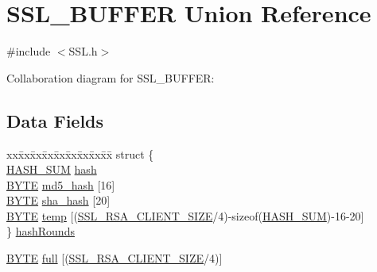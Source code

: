 \hypertarget{union_s_s_l___b_u_f_f_e_r}{}\section{S\+S\+L\+\_\+\+B\+U\+F\+F\+E\+R Union Reference}
\label{union_s_s_l___b_u_f_f_e_r}


{\ttfamily \#include $<$S\+S\+L.\+h$>$}



Collaboration diagram for S\+S\+L\+\_\+\+B\+U\+F\+F\+E\+R\+:
\subsection*{Data Fields}
\begin{DoxyCompactItemize}
\item 
\begin{tabbing}
xx\=xx\=xx\=xx\=xx\=xx\=xx\=xx\=xx\=\kill
struct \{\\
\>\hyperlink{struct_h_a_s_h___s_u_m}{HASH\_SUM} \hyperlink{union_s_s_l___b_u_f_f_e_r_a731167501e52d6b72fc839512360317c}{hash}\\
\>\hyperlink{_generic_type_defs_8h_a4ae1dab0fb4b072a66584546209e7d58}{BYTE} \hyperlink{union_s_s_l___b_u_f_f_e_r_a4d816c823a2beb8993b3ef56766bacce}{md5\_hash} \mbox{[}16\mbox{]}\\
\>\hyperlink{_generic_type_defs_8h_a4ae1dab0fb4b072a66584546209e7d58}{BYTE} \hyperlink{union_s_s_l___b_u_f_f_e_r_a5d335aa13662b316b20dbc8b6f34b12b}{sha\_hash} \mbox{[}20\mbox{]}\\
\>\hyperlink{_generic_type_defs_8h_a4ae1dab0fb4b072a66584546209e7d58}{BYTE} \hyperlink{union_s_s_l___b_u_f_f_e_r_a7b17c7a8a20473315a63c02148759677}{temp} \mbox{[}(\hyperlink{_s_s_l_client_size_8h_a1a30802efbae822f43c0fa208ceea87c}{SSL\_RSA\_CLIENT\_SIZE}/4)-\/sizeof(\hyperlink{struct_h_a_s_h___s_u_m}{HASH\_SUM})-\/16-\/20\mbox{]}\\
\} \hyperlink{union_s_s_l___b_u_f_f_e_r_aefa66f9631daa4521f6a777625f23f5f}{hashRounds}\\

\end{tabbing}\item 
\hyperlink{_generic_type_defs_8h_a4ae1dab0fb4b072a66584546209e7d58}{B\+Y\+T\+E} \hyperlink{union_s_s_l___b_u_f_f_e_r_a4c25cd300ec889961a45436274fc1093}{full} \mbox{[}(\hyperlink{_s_s_l_client_size_8h_a1a30802efbae822f43c0fa208ceea87c}{S\+S\+L\+\_\+\+R\+S\+A\+\_\+\+C\+L\+I\+E\+N\+T\+\_\+\+S\+I\+Z\+E}/4)\mbox{]}
\end{DoxyCompactItemize}


